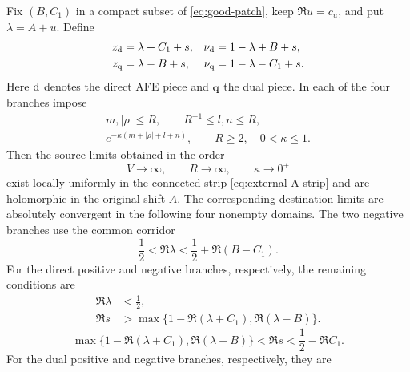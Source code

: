 \begin{proposition}
\label{prop:four-branch-regulator-tonelli}
Fix $(B,C_1)$ in a compact subset of \eqref{eq:good-patch}, keep
$\Re u=c_u$, and put $\lambda=A+u$.  Define
\begin{align}
 z_{\rm d}&=\lambda+C_1+s,
 &\nu_{\rm d}&=1-\lambda+B+s,
 \label{eq:four-branch-direct-vars}\\
 z_{\rm q}&=\lambda-B+s,
 &\nu_{\rm q}&=1-\lambda-C_1+s.
 \label{eq:four-branch-dual-vars}
\end{align}
Here ${\rm d}$ denotes the direct AFE piece and ${\rm q}$ the dual piece.
In each of the four branches impose
\begin{equation}\label{eq:finite-regulators}
 \begin{gathered}
 m,|\rho|\leq R,\qquad R^{-1}\leq l,n\leq R,\\
 e^{-\kappa(m+|\rho|+l+n)},\qquad
 R\geq2,\quad0<\kappa\leq1.
 \end{gathered}
\end{equation}
Then the source limits obtained in the order
\begin{equation}\label{eq:four-branch-order}
 V\longrightarrow\infty,\qquad R\longrightarrow\infty,
 \qquad\kappa\longrightarrow0^+
\end{equation}
exist locally uniformly in the connected strip
\eqref{eq:external-A-strip} and are holomorphic in the original shift $A$.
The corresponding destination limits are absolutely convergent in the
following four nonempty domains.  The two negative branches use the common
corridor
\begin{equation}\label{eq:lambda-corridor}
            \frac12<\Re\lambda
            <\frac12+\Re(B-C_1).
\end{equation}
For the direct positive and negative branches, respectively, the remaining
conditions are
\begin{equation}\label{eq:positive-direct-tonelli}
 \begin{aligned}
 \Re\lambda&<\frac12,\\
 \Re s&>\max\{1-\Re(\lambda+C_1),\Re(\lambda-B)\}.
 \end{aligned}
\end{equation}
\begin{equation}\label{eq:direct-tonelli}
 \max\{1-\Re(\lambda+C_1),\Re(\lambda-B)\}
 <\Re s<\frac12-\Re C_1.
\end{equation}
For the dual positive and negative branches, respectively, they are
\begin{equation}\label{eq:positive-dual-tonelli}

\end{equation}
\end{proposition}
